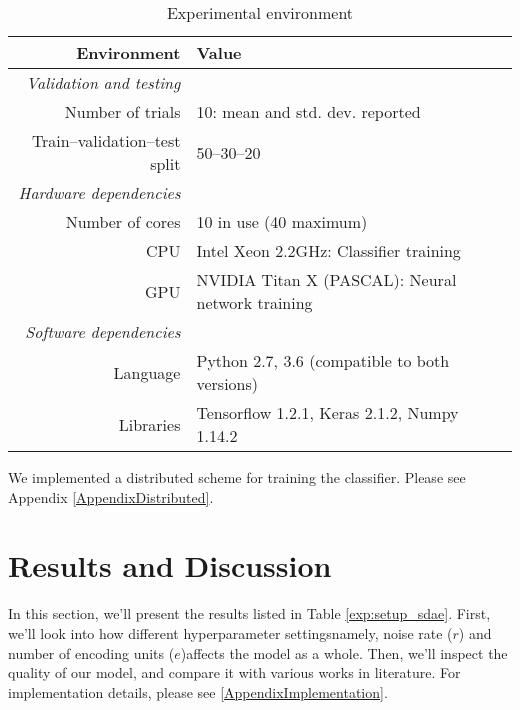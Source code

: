 \begin{table}[t]
  \centering
  \caption{Experimental environment}
  \label{exp:implementation_sdae}
  \begin{threeparttable}
  \begin{tabular}{@{}rp{}@{}}
      \toprule
      Environment                    & Value                                             \\ \midrule
      \textit{Validation and testing}                                                    \\
      Number of trials               & 10: mean and std. dev. reported                   \\
      Train--validation--test split  & 50--30--20                                        \\ \cmidrule{1-2}
      \textit{Hardware dependencies}                                                     \\
      Number of cores\tnote{1}       & 10 in use (40 maximum)                            \\
      CPU                            & Intel Xeon 2.2GHz: Classifier training            \\
      GPU                            & NVIDIA Titan X (PASCAL): Neural network training  \\ \cmidrule{1-2} 
      \textit{Software dependencies}                                                     \\
      Language                & Python 2.7, 3.6 (compatible to both versions)            \\
      Libraries               & Tensorflow 1.2.1, Keras 2.1.2, Numpy 1.14.2              \\ \bottomrule
  \end{tabular}
  \begin{tablenotes}
    \footnotesize
    \item[1] We implemented a distributed scheme for training the classifier.
    Please see Appendix \ref{AppendixDistributed}.
  \end{tablenotes}
  \end{threeparttable}
\end{table}

\section{Results and Discussion}
\label{SDResults}

In this section, we'll present the results listed in Table
\ref{exp:setup_sdae}. First, we'll look into how different hyperparameter
settings\textemdash namely, noise rate ($r$) and number of encoding units
($e$)\textemdash affects the model as a whole. Then, we'll inspect the
quality of our model, and compare it with various works in literature.
For implementation details, please see \ref{AppendixImplementation}.

